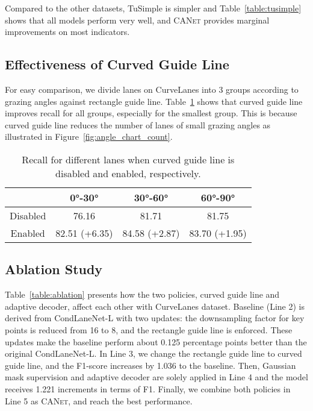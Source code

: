 \documentclass{article}
\newcommand\self{\textsc{CANet}\xspace}
\begin{document}
Compared to the other datasets, TuSimple is simpler and
Table~\ref{table:tusimple} shows that all models perform very well, and \self
provides marginal improvements on most indicators.


\subsection{Effectiveness of Curved Guide Line}

For easy comparison, we divide lanes on CurveLanes into 3 groups according to grazing angles
against rectangle guide line. Table~\ref{table:cgl_ablation} shows that
curved guide line improves recall for all groups, especially for the
smallest group. This is because curved guide line reduces the number of lanes of small grazing
angles as illustrated in Figure~\ref{fig:angle_chart_count}.


\begin{table}
    \caption{Recall for different lanes when curved guide line is disabled and enabled, respectively.}
    \label{table:cgl_ablation}
    \centering
        \begin{tabular}{cccc}\hline
                & 0°-30°        & 30°-60°        & 60°-90°          \\ \hline
        Disabled & 76.16        & 81.71         & 81.75          \\
        Enabled  & 82.51 (+6.35) & 84.58 (+2.87)  & 83.70 (+1.95)\\\hline
        \end{tabular}
\end{table}




\subsection{Ablation Study}

Table~\ref{table:ablation} presents how the two policies, curved guide line and
adaptive decoder, affect each other with CurveLanes dataset. Baseline (Line 2)
is derived from CondLaneNet-L with two updates: the downsampling factor for key
points is reduced from 16 to 8, and the rectangle guide line is enforced. These
updates make the baseline perform about 0.125 percentage points better than the
original CondLaneNet-L. In Line 3, we change the rectangle guide line to curved
guide line, and the F1-score increases by 1.036 to the baseline. Then, Gaussian
mask supervision and adaptive decoder are solely applied in Line 4 and the model
receives 1.221 increments in terms of F1. Finally, we combine both policies in
Line 5 as \self, and reach the best performance.
\end{document}
